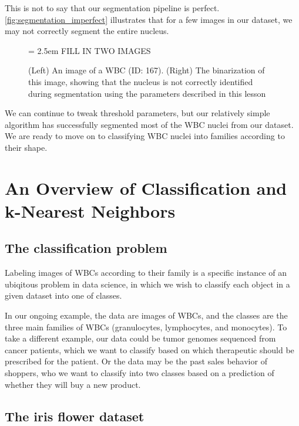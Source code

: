 This is not to say that our segmentation pipeline is perfect. \autoref{fig:segmentation_imperfect} illustrates that for a few images in our dataset, we may not correctly segment the entire nucleus.

\begin{figure}[h]
\centering
\tabcolsep = 2.5em
\mySfFamily
 FILL IN TWO IMAGES

\caption{(Left) An image of a WBC (ID: 167). (Right) The binarization of this image, showing that the nucleus is not correctly identified during segmentation using the parameters described in this lesson}
\label{fig:segmentation_imperfect}
\end{figure}

We can continue to tweak threshold parameters, but our relatively simple algorithm has successfully segmented most of the WBC nuclei from our dataset. We are ready to move on to classifying WBC nuclei into families according to their shape.

\FloatBarrier
{}
\section{An Overview of Classification and k-Nearest Neighbors}
\label{sec:knn}


\subsection{The classification problem}

Labeling images of WBCs according to their family is a specific instance of an ubiqitous problem in data science, in which we wish to classify each object in a given dataset into one of  classes.

In our ongoing example, the data are images of WBCs, and the classes are the three main families of WBCs (granulocytes, lymphocytes, and monocytes). To take a different example, our data could be tumor genomes sequenced from cancer patients, which we want to classify based on which therapeutic should be prescribed for the patient. Or the data may be the past sales behavior of shoppers, who we want to classify into two classes based on a prediction of whether they will buy a new product.

\FloatBarrier
{}
\subsection{The iris flower dataset}

